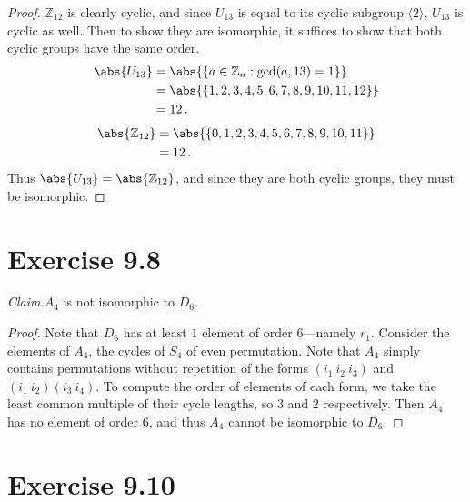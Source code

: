 \documentclass{abrice}
\newcommand{\Z}{\mathbb{Z}}
\renewcommand{\P}{\mathscr{P}}
\newcommand{\Claim}{\noindent\emph{Claim.}\xspace}%
\begin{document}
\begin{proof}
  $\Z_{12}$ is clearly cyclic, and since $U_{13}$ is equal to its cyclic
  subgroup $\langle 2 \rangle$, $U_{13}$ is cyclic as well. Then to show they
  are isomorphic, it suffices to show that both cyclic groups have the same
  order.
  \begin{align*}
    \abs{U_{13}}
    &= \abs{ \{ a \in \Z_n : \gcd(a,13) = 1 \} } \\
    &= \abs{\{1,2,3,4,5,6,7,8,9,10,11,12\}} \\
    &= 12\, .
  \end{align*}
  \begin{align*}
    \abs{\Z_{12}}
    &= \abs{ \{0,1,2,3,4,5,6,7,8,9,10,11\} } \\
    &= 12\, .
  \end{align*}
  Thus $\abs{U_{13}} = \abs{\Z_{12}}$, and since they are both cyclic groups,
  they must be isomorphic.
\end{proof}

\section{Exercise 9.8}

\Claim $A_4$ is not isomorphic to $D_6$.

\begin{proof}
  Note that $D_6$ has at least $1$ element of order $6$---namely $r_1$. Consider
  the elements of $A_4$, the cycles of $S_4$ of even permutation. Note that
  $A_4$ simply contains permutations without repetition of the forms $(i_1\ i_2\
  i_3)$ and $(i_1\ i_2)(i_3\ i_4)$. To compute the order of elements of each
  form, we take the least common multiple of their cycle lengths, so $3$ and $2$
  respectively. Then $A_4$ has no element of order $6$, and thus $A_4$ cannot be
  isomorphic to $D_6$.
\end{proof}

\section{Exercise 9.10}
\end{document}
